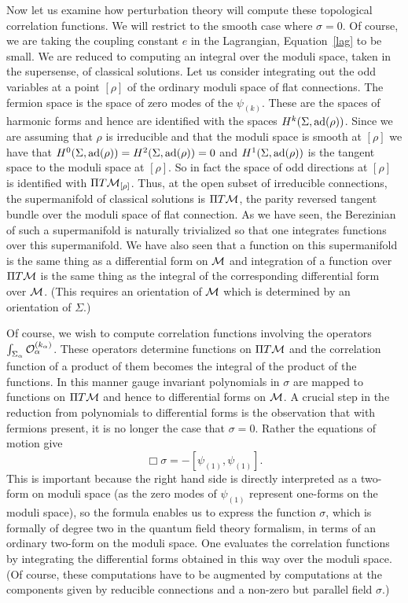 Now let us examine how perturbation theory will compute these
topological correlation functions. We will restrict to the smooth case
where $\sigma=0$. Of course, we are taking the  coupling
constant  $e$ in the Lagrangian, Equation~\ref{lag}  to be small. We
are reduced to 
computing an integral over the moduli space, taken in the supersense,
of classical solutions. Let us consider
integrating out the odd variables at a point $[\rho]$ of the ordinary
moduli space of flat connections.  The fermion
space is the space of zero modes of the $\psi_{(k)}$.  These are the
spaces of harmonic forms and hence are identified with the spaces 
$H^k(\Sigma,{\rm ad}(\rho))$. Since we are
assuming that $\rho$ is irreducible and that the moduli space is
smooth at $[\rho]$ we have that $H^0(\Sigma,{\rm
ad}(\rho))=H^2(\Sigma,{\rm ad}(\rho))=0$ and $H^1(\Sigma,{\rm
ad}(\rho))$ is the tangent space to the moduli space at $[\rho]$.
So in fact the space of odd directions at $[\rho]$ is identified with
$\Pi T{\cal M}_{[\rho]}$.  Thus, at the open subset of irreducible
connections, the supermanifold of classical 
solutions is $\Pi T{\cal M}$, the parity reversed 
tangent bundle over the moduli space of flat connection. 
As we have seen, the Berezinian of such a supermanifold is naturally
trivialized so that one integrates functions over this
supermanifold. We have also seen that  a function on this
supermanifold is the same thing as 
a differential form on ${\cal M}$ and integration of a function  over $\Pi
T{\cal M}$ is the same thing as the integral of the corresponding
differential form over ${\cal M}$. (This requires an orientation of
${\cal M}$ which is determined by an orientation of $\Sigma$.)

Of course, we wish to compute correlation functions involving the
operators $\int_{\Sigma_\alpha}{\cal O}_\alpha^{(k_\alpha)}$.
These operators determine functions on $\Pi T{\cal M}$ and the
correlation function of a product of them becomes the integral of the
product of the functions.
In this manner gauge invariant polynomials in $\sigma$ are mapped to
functions on $\Pi T{\cal M}$ and hence to differential forms on ${\cal
M}$. 
A crucial step in the reduction from polynomials to differential forms
is the observation
that with fermions present, it is no longer the case that
$\sigma=0$. Rather the equations of motion give
$$\Box \sigma=-[\psi_{(1)},\psi_{(1)}].$$
This is important because the right hand side is directly interpreted
as a two-form on moduli space (as the zero modes of $\psi_{(1)}$
represent one-forms on the moduli space), so the formula enables
us to express the function $\sigma$, which is formally of degree two
in the quantum field theory formalism, in terms of an ordinary two-form
on the moduli space.  One evaluates the correlation functions by 
integrating the differential forms obtained in this way over the moduli 
space.  (Of course, these computations have to be augmented by
computations at the components given by reducible connections and a
non-zero but parallel field $\sigma$.)


